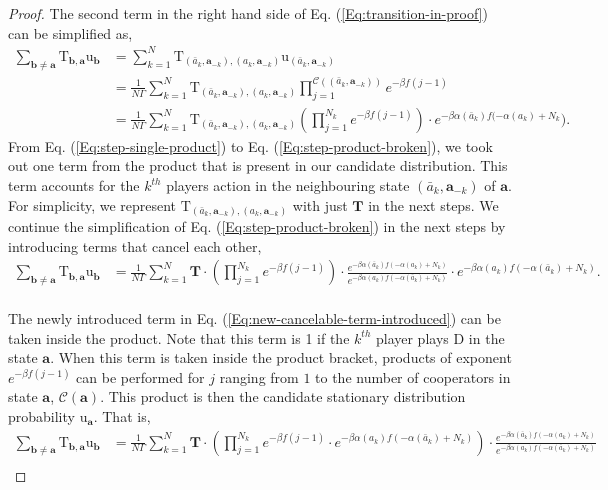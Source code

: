 \documentclass[11pt]{article}
\theoremstyle{plainCl1}
\theoremstyle{plainCl2}
\newcommand{\abf}{\mathbf{a}}
\newcommand{\bbf}{\mathbf{b}}
\newcommand{\T}{\mathbf{T}}
\newcommand{\D}{\mathrm{D}}
\begin{document}
\begin{proof}
The second term in the right hand side of Eq. (\ref{Eq:transition-in-proof}) can be simplified as, 
\begin{align}
\sum_{\bbf \neq \abf} \mathrm{T}_{\bbf, \abf} \mathrm{u}_{\bbf} &= \sum_{k=1}^N \mathrm{T}_{(\bar{a}_k, \abf_{-k}),(a_k, \abf_{-k})} \mathrm{u}_{(\bar{a}_k, \abf_{-k})} \\[10pt]
\label{Eq:step-single-product}
&= \frac{1}{N \Gamma} \sum_{k=1}^N \mathrm{T}_{(\bar{a}_k, \abf_{-k}),(a_k, \abf_{-k})} \displaystyle \prod_{j=1}^{\mathcal{C}((\bar{a}_k, \abf_{-k}))} e^{-\beta f(j-1)}\\[10pt]
&=  \frac{1}{N \Gamma} \sum_{k=1}^N \mathrm{T}_{(\bar{a}_k, \abf_{-k}),(a_k, \abf_{-k})} \displaystyle \left( \prod_{j=1}^{N_k}  e^{-\beta f(j-1)} \right) \cdot e^{-\beta \alpha(\bar{a}_k)f(-\alpha(a_k)+ N_k}) .
\label{Eq:step-product-broken}
\end{align}
From Eq. (\ref{Eq:step-single-product}) to Eq. (\ref{Eq:step-product-broken}), we took out one term from the product that is present in our candidate distribution. This term accounts for the $k^{th}$ players action in the neighbouring state $(\bar{a}_k, \abf_{-k})$ of $\abf$. For simplicity, we represent $\mathrm{T}_{(\bar{a}_k, \abf_{-k}),(a_k, \abf_{-k})}$ with just $\T$ in the next steps. We continue the simplification of Eq. (\ref{Eq:step-product-broken}) in the next steps by introducing terms that cancel each other, \\[10pt]
\begin{align}
\sum_{\bbf \neq \abf} \mathrm{T}_{\bbf, \abf} \mathrm{u}_{\bbf} &=  \frac{1}{N \Gamma} \sum_{k=1}^N \T \cdot \displaystyle \left( \prod_{j=1}^{N_k}  e^{-\beta f(j-1)} \right) \cdot \frac{e^{-\beta \alpha(\bar{a}_k)f(-\alpha(a_k)+ N_k)}}{e^{-\beta \alpha(a_k)f(-\alpha(\bar{a}_k) +N_k)}} \cdot e^{-\beta \alpha(a_k)f(-\alpha(\bar{a}_k) + N_k)} .
\label{Eq:new-cancelable-term-introduced}
\end{align}
\\ \noindent The newly introduced term in Eq. (\ref{Eq:new-cancelable-term-introduced}) can be taken inside the product. Note that this term is 1 if the $k^{th}$ player plays $\D$ in the state $\abf$. When this term is taken inside the product bracket, products of exponent $e^{-\beta f(j-1)}$ can be performed for $j$ ranging from $1$ to the number of cooperators in state $\abf$, $\mathcal{C}(\abf)$. This product is then the candidate stationary distribution probability $\mathrm{u}_\abf$. That is, 
\begin{align}
\sum_{\bbf \neq \abf} \mathrm{T}_{\bbf, \abf} \mathrm{u}_{\bbf} &=  \frac{1}{N \Gamma} \sum_{k=1}^N \T \cdot \displaystyle \left( \prod_{j=1}^{N_k}  e^{-\beta f(j-1)} \cdot e^{-\beta \alpha(a_k)f(-\alpha(\bar{a}_k) + N_k)} \right) \cdot \frac{e^{-\beta \alpha(\bar{a}_k)f(-\alpha(a_k)+ N_k)}}{e^{-\beta \alpha(a_k)f(-\alpha(\bar{a}_k) +N_k)}} \\[10pt]

\end{align}
\end{proof}
\end{document}
